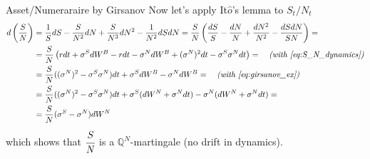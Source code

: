 \documentclass{beamer}
\begin{document}
\begin{frame}{Asset/Numeraraire by Girsanov}
  Now let's apply It$\hat{o}$'s lemma to $S_t/N_t$
  \begin{equation*}
    \begin{aligned}
      d\left(\frac{S}{N}\right) &= \frac{1}{S}dS - \frac{S}{N^2}dN + \frac{S}{N^3}dN^2-\frac{1}{N^2}dSdN = \frac{S}{N}\left(\frac{dS}{S}-\frac{dN}{N}+\frac{dN^2}{N^2}-\frac{dSdN}{SN} \right) = \\
      &=\frac{S}{N}\left(rdt+\sigma^S dW^B - rdt - \sigma^N dW^B + (\sigma^N)^2 dt - \sigma^S\sigma^N dt \right) = \quad\textit{(with \cref{eq:S_N_dynamics})}\\
      &=\frac{S}{N}((\sigma^N)^2 - \sigma^S\sigma^N) dt + \sigma^S dW^B - \sigma^N dW^B = \quad\textit{(with \cref{eq:girsanov_ex})}\\
      &=\frac{S}{N}((\sigma^N)^2 - \sigma^S\sigma^N) dt + \sigma^S (dW^N + \sigma^N dt) - \sigma^N(dW^N+\sigma^Ndt) = \\
      &=\frac{S}{N}(\sigma^S - \sigma^N)dW^N 
      \end{aligned}
  \end{equation*}
  which shows that $\cfrac{S}{N}$ is a $\mathbb{Q}^N$-martingale (no drift in dynamics).
\end{frame}

\end{document}
